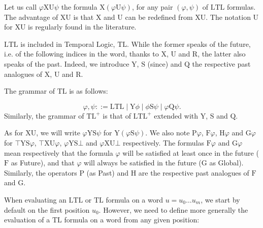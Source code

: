 \documentclass[a4paper,UKenglish,cleveref, autoref, thm-restate]{lipics-v2021}
\newcommand{\LTL}{\mathrm{LTL}}
\newcommand{\LTLp}{\LTL^+}
\newcommand{\TL}{\mathrm{TL}}
\newcommand{\TLp}{\TL^+}
\newcommand{\X}{\mathrm{X}}
\newcommand{\Y}{\mathrm{Y}}
\newcommand{\U}{\mathrm{U}}
\renewcommand{\S}{\mathrm{S}}
\newcommand{\Q}{\mathrm{Q}}
\newcommand{\XU}{\mathrm{XU}}
\newcommand{\YS}{\mathrm{YS}}
\newcommand{\R}{\mathrm{R}}
\renewcommand{\P}{\mathrm{P}}
\newcommand{\F}{\mathrm{F}}
\renewcommand{\H}{\mathrm{H}}
\newcommand{\G}{\mathrm{G}}
\begin{document}
\begin{remark}
        Let us call $\varphi \XU \psi$ the formula $\X (\varphi \U \psi)$, for any pair $(\varphi,\psi)$ of $\LTL$ formulas. The advantage of $\XU$ is that $\X$ and $\U$ can be redefined from $\XU$. The notation $\U$ for $\XU$ is regularly found in the literature. \end{remark}






$\LTL$ is included in Temporal Logic, $\TL$. While the former speaks of the future, i.e. of the following indices in the word, thanks to $\X$, $\U$ and $\R$, the latter also speaks of the past. Indeed, we introduce $\Y$, $\S$ (since) and $\Q$ the respective past analogues of $\X$, $\U$ and $\R$.



\begin{definition}
    The grammar of $\TL$ is as follows:
    \vspace{-1em}
    
    $$\varphi, \psi::= \LTL \mid \Y \phi \mid \phi \S \psi \mid \varphi \Q \psi.$$
    Similarly, the grammar of $\TLp$ is that of $\LTLp$ extended with $\Y$, $\S$ and $\Q$.
\end{definition}


\begin{remark}
    As for $\XU$, we will write $\varphi \YS \psi$ for $\Y (\varphi \S \psi)$. We also note $\P \varphi$, $\F \varphi$, $\H \varphi$ and $\G \varphi$ for $\top \YS \varphi$, $\top \XU \varphi$, $\varphi \YS \bot$ and $\varphi \XU \bot$ respectively. The formulas $\F \varphi$ and $\G \varphi$ mean respectively that the formula $\varphi$ will be satisfied at least once in the future ($\F$ as Future), and that $\varphi$ will always be satisfied in the future ($\G$ as Global). Similarly, the operators $\P$ (as Past) and $\H$ are the respective past analogues of $\F$ and $\G$.
\end{remark}








When evaluating an $\LTL$ or $\TL$ formula on a word $u=u_0\dots u_m$, we start by default on the first position $u_0$. However, we need to define more generally the evaluation of a $\TL$ formula on a word from any given position:
\end{document}
